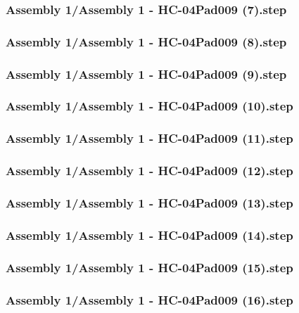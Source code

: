 \documentclass[a4paper,12pt]{article}
\begin{document}
\subsubsection{Assembly 1/Assembly 1 - HC-04Pad009 (7).step}

\subsubsection{Assembly 1/Assembly 1 - HC-04Pad009 (8).step}

\subsubsection{Assembly 1/Assembly 1 - HC-04Pad009 (9).step}

\subsubsection{Assembly 1/Assembly 1 - HC-04Pad009 (10).step}

\subsubsection{Assembly 1/Assembly 1 - HC-04Pad009 (11).step}

\subsubsection{Assembly 1/Assembly 1 - HC-04Pad009 (12).step}

\subsubsection{Assembly 1/Assembly 1 - HC-04Pad009 (13).step}

\subsubsection{Assembly 1/Assembly 1 - HC-04Pad009 (14).step}

\subsubsection{Assembly 1/Assembly 1 - HC-04Pad009 (15).step}

\subsubsection{Assembly 1/Assembly 1 - HC-04Pad009 (16).step}

\end{document}
